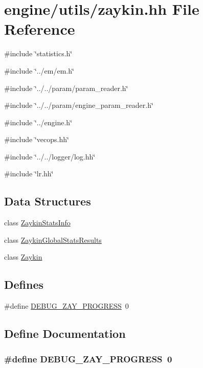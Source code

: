 \hypertarget{zaykin_8hh}{
\section{engine/utils/zaykin.hh File Reference}
\label{zaykin_8hh}
}
{\ttfamily \#include \char`\"{}statistics.h\char`\"{}}\par
{\ttfamily \#include \char`\"{}../em/em.h\char`\"{}}\par
{\ttfamily \#include \char`\"{}../../param/param\_\-reader.h\char`\"{}}\par
{\ttfamily \#include \char`\"{}../../param/engine\_\-param\_\-reader.h\char`\"{}}\par
{\ttfamily \#include \char`\"{}../engine.h\char`\"{}}\par
{\ttfamily \#include \char`\"{}vecops.hh\char`\"{}}\par
{\ttfamily \#include \char`\"{}../../logger/log.hh\char`\"{}}\par
{\ttfamily \#include \char`\"{}lr.hh\char`\"{}}\par
\subsection*{Data Structures}
\begin{DoxyCompactItemize}
\item 
class \hyperlink{classZaykinStatsInfo}{ZaykinStatsInfo}
\item 
class \hyperlink{classZaykinGlobalStatsResults}{ZaykinGlobalStatsResults}
\item 
class \hyperlink{classZaykin}{Zaykin}
\end{DoxyCompactItemize}
\subsection*{Defines}
\begin{DoxyCompactItemize}
\item 
\#define \hyperlink{zaykin_8hh_a290cdf2fd2ced06dc2c0430aa339512f}{DEBUG\_\-ZAY\_\-PROGRESS}~0
\end{DoxyCompactItemize}


\subsection{Define Documentation}
\hypertarget{zaykin_8hh_a290cdf2fd2ced06dc2c0430aa339512f}{
\subsubsection[{DEBUG\_\-ZAY\_\-PROGRESS}]{\setlength{\rightskip}{0pt plus 5cm}\#define DEBUG\_\-ZAY\_\-PROGRESS~0}}
\label{zaykin_8hh_a290cdf2fd2ced06dc2c0430aa339512f}
